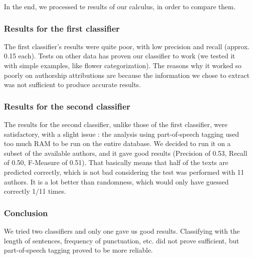 In the end, we processed te results of our calculus, in order to compare them.

\subsubsection {Results for the first classifier}

The first classifier's results were quite poor, with low precision and recall (approx. 0.15 each).
Tests on other data has proven our classifier to work (we tested it with simple examples, like flower categorization).
The reasons why it worked so poorly on authorship attributions are because the information we chose to extract was not sufficient to produce accurate results.


\subsubsection {Results for the second classifier}

The results for the second classifier, unlike those of the first classifier, were satisfactory, with a slight issue : the analysis using part-of-speech tagging used too much RAM to be run on the entire database.
We decided to run it on a subset of the available authors, and it gave good results (Precision of 0.53, Recall of 0.50, F-Measure of 0.51).
That basically means that half of the texts are predicted correctly, which is not bad considering the test was performed with 11 authors.
It is a lot better than randomness, which would only have guessed correctly 1/11 times.


\subsubsection {Conclusion}

We tried two classifiers and only one gave us good results. Classifying with the length of sentences, frequency of punctuation, etc. did not prove sufficient, but  part-of-speech tagging proved to be more reliable.